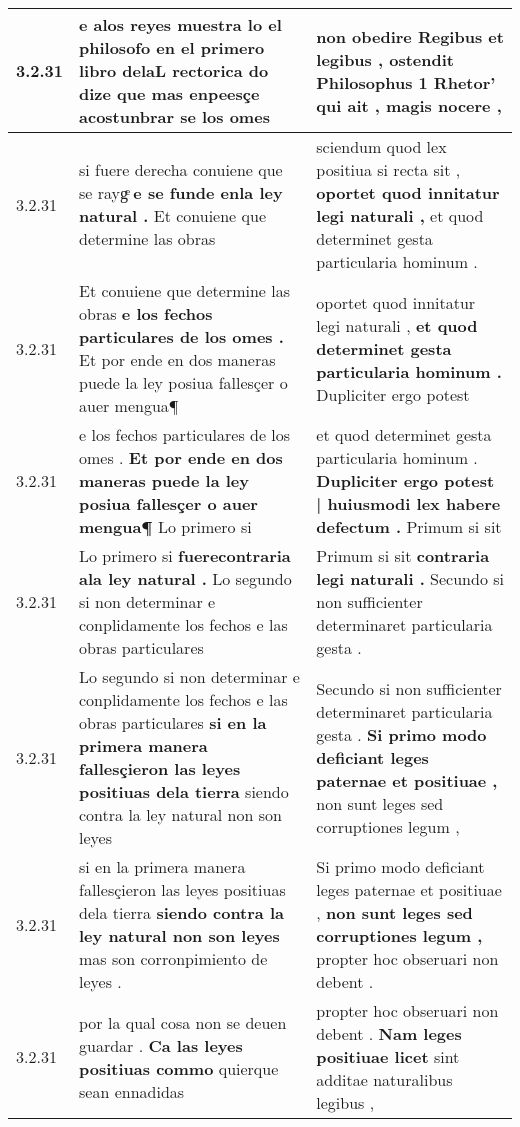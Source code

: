 \begin{tabular}{|p{1cm}|p{6.5cm}|p{6.5cm}|}
3.2.31 & e alos reyes muestra lo el philosofo \textbf{ en el primero libro delaL rectorica } do dize que mas enpeesçe acostunbrar se los omes & non obedire Regibus et legibus , \textbf{ ostendit Philosophus 1 Rhetor’ } qui ait , magis nocere , \\\hline
3.2.31 & si fuere derecha conuiene que se raygͤ \textbf{ e se funde enla ley natural . } Et conuiene que determine las obras & sciendum quod lex positiua si recta sit , \textbf{ oportet quod innitatur legi naturali , } et quod determinet gesta particularia hominum . \\\hline
3.2.31 & Et conuiene que determine las obras \textbf{ e los fechos particulares de los omes . } Et por ende en dos maneras puede la ley posiua fallesçer o auer mengua¶ & oportet quod innitatur legi naturali , \textbf{ et quod determinet gesta particularia hominum . } Dupliciter ergo potest \\\hline
3.2.31 & e los fechos particulares de los omes . \textbf{ Et por ende en dos maneras puede la ley posiua fallesçer o auer mengua¶ } Lo primero si & et quod determinet gesta particularia hominum . \textbf{ Dupliciter ergo potest | huiusmodi lex habere defectum . } Primum si sit \\\hline
3.2.31 & Lo primero si \textbf{ fuerecontraria ala ley natural . } Lo segundo si non determinar e conplidamente los fechos e las obras particulares & Primum si sit \textbf{ contraria legi naturali . } Secundo si non sufficienter determinaret particularia gesta . \\\hline
3.2.31 & Lo segundo si non determinar e conplidamente los fechos e las obras particulares \textbf{ si en la primera manera fallesçieron las leyes positiuas dela tierra } siendo contra la ley natural non son leyes & Secundo si non sufficienter determinaret particularia gesta . \textbf{ Si primo modo deficiant leges paternae et positiuae , } non sunt leges sed corruptiones legum , \\\hline
3.2.31 & si en la primera manera fallesçieron las leyes positiuas dela tierra \textbf{ siendo contra la ley natural non son leyes } mas son corronpimiento de leyes . & Si primo modo deficiant leges paternae et positiuae , \textbf{ non sunt leges sed corruptiones legum , } propter hoc obseruari non debent . \\\hline
3.2.31 & por la qual cosa non se deuen guardar . \textbf{ Ca las leyes positiuas commo } quierque sean ennadidas & propter hoc obseruari non debent . \textbf{ Nam leges positiuae licet } sint additae naturalibus legibus , \\\hline

\end{tabular}
